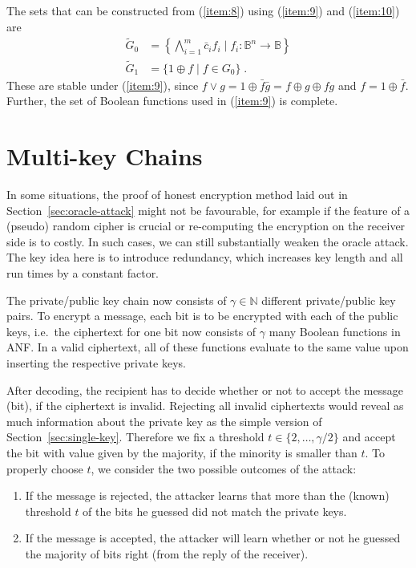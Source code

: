 \documentclass[final,journal,compsoc]{IEEEtran}
\begin{document}
The sets that can be constructed from
(\ref{item:8}) using (\ref{item:9}) and (\ref{item:10}) are
\begin{align}
\tilde G_0 &= \left\{\bigwedge_{i=1}^m \bar
c_i f_i \; | \; f_i : \mathbb B^n \to \mathbb B\right\}\\
\tilde G_1 &= \{1 \oplus f\; | \; f \in G_0\}
\;.
\end{align}
These are stable under (\ref{item:9}),
since $f \vee g = 1 \oplus \bar f \bar g = f \oplus g \oplus fg$ and
$f = 1 \oplus \bar f$. Further, the set of Boolean functions used in
(\ref{item:9}) is complete.



\section{Multi-key Chains\label{sec:multi-key}}

In some situations, the proof of honest encryption method laid out in
Section~\ref{sec:oracle-attack} might not be favourable, for example if the
feature of a (pseudo) random cipher is crucial or re-computing the
encryption on the receiver side is to costly. In such cases, we can
still substantially weaken the oracle attack.  The key idea here is to
introduce redundancy, which increases key length and all run times by
a constant factor. 


The private/public key chain now consists of
$\gamma \in \mathbb N$ different private/public key pairs. To encrypt a message,
each bit is to be encrypted with each of the public keys, i.e.\
the ciphertext for one bit now consists of $\gamma$ many Boolean functions
in ANF. In a valid ciphertext, all of these functions evaluate to the same
value upon inserting the respective private keys.


After decoding, the recipient has to decide whether or not to accept
the message (bit), if the ciphertext is invalid. Rejecting all invalid
ciphertexts would reveal as much information about the private key as the
simple version of Section~\ref{sec:single-key}. Therefore we fix a
threshold $t \in \{2,\ldots,\gamma/2\}$ and accept the bit with value
given by the majority, if the minority is smaller than $t$. To
properly choose $t$, we consider the two possible outcomes of the
attack:
\begin{enumerate}
\item If the message is rejected, the attacker learns that more than
  the (known) threshold $t$ of the bits he guessed did not match the
  private keys. \label{it:rej}

\item If the message is accepted, the attacker will learn whether or
  not he guessed the majority of bits right (from the reply of the
  receiver).

\end{enumerate}
\end{document}
